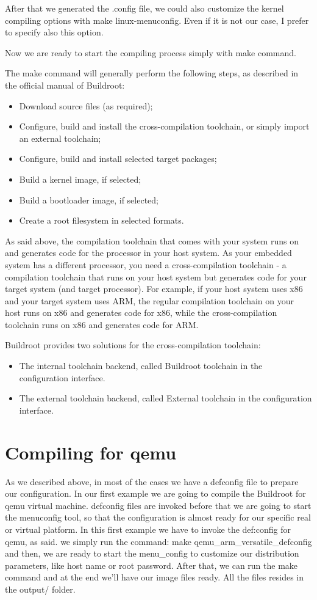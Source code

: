 \documentclass[a4paper,twoside,11pt]{article}
\begin{document}
After that we generated the .config file, we could also customize the kernel compiling options with make linux-menuconfig.
Even if it is not our case, I prefer to specify also this option.
 
Now we are ready to start the compiling process simply with make command.

The make command will generally perform the following steps, as described in the official manual of Buildroot:

\begin{itemize}
\item Download source files (as required);
\item Configure, build and install the cross-compilation toolchain, or simply import an external toolchain;
\item Configure, build and install selected target packages;
\item Build a kernel image, if selected;
\item Build a bootloader image, if selected;
\item Create a root filesystem in selected formats.
\end{itemize}
As said above, the compilation toolchain that comes with your system runs on and generates code for the processor in your host system. As your embedded system has a different processor, you need a cross-compilation toolchain - a compilation toolchain that runs on your host system but generates code for your target system (and target processor). For example, if your host system uses x86 and your target system uses ARM, the regular compilation toolchain on your host runs on x86 and generates code for x86, while the cross-compilation toolchain runs on x86 and generates code for ARM.

Buildroot provides two solutions for the cross-compilation toolchain:
\begin{itemize}
\item The internal toolchain backend, called Buildroot toolchain in the configuration interface.
\item The external toolchain backend, called External toolchain in the configuration interface.
\end{itemize}


\section{Compiling for qemu}
As we described above, in most of the cases we have a defconfig file to prepare our configuration.
In our first example we are going to compile the Buildroot for qemu virtual machine.
defconfig files are invoked before that we are going to start the menuconfig tool, so that the configuration is almost ready for our specific real or virtual platform.
In this first example we have to invoke the def:config for qemu, as said.
we simply run the command:
make qemu\_arm\_versatile\_defconfig
and then, we are ready to start the menu\_config to customize our distribution parameters, like host name or root password.
After that, we can run the make command and at the end we'll have our image files ready.
All the files resides in the output/ folder.
\end{document}
